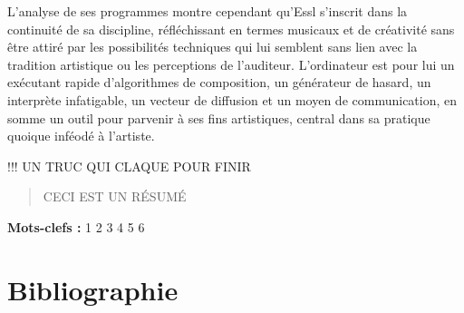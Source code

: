 \documentclass[a4paper,12pt]{article}
\begin{document}
L'analyse de ses programmes montre cependant qu'Essl s'inscrit dans la continuité de sa discipline, réfléchissant en termes musicaux et de créativité sans être attiré par les possibilités techniques qui lui semblent sans lien avec la tradition artistique ou les perceptions de l'auditeur. L'ordinateur est pour lui un exécutant rapide d'algorithmes de composition, un générateur de hasard, un interprète infatigable, un vecteur de diffusion et un moyen de communication, en somme un outil pour parvenir à ses fins artistiques, central dans sa pratique quoique inféodé à l'artiste.

!!! UN TRUC QUI CLAQUE POUR FINIR







\newpage
\begin{abstract}
CECI EST UN RÉSUMÉ
\end{abstract}
\bigskip
\textbf{Mots-clefs :} 1 2 3 4 5 6

\newpage
\nocite{*}
\section{Bibliographie}
\end{document}
